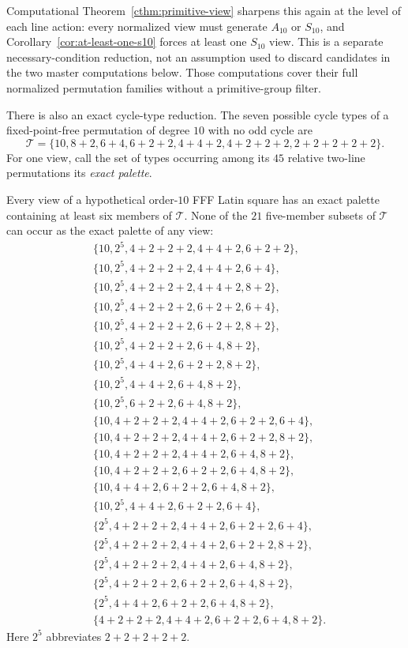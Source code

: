 Computational Theorem~\ref{cthm:primitive-view} sharpens this again at the
level of each line action: every normalized view must generate $A_{10}$ or
$S_{10}$, and Corollary~\ref{cor:at-least-one-s10} forces at least one
$S_{10}$ view.  This is a separate necessary-condition reduction, not an
assumption used to discard candidates in the two master computations below.
Those computations cover their full normalized permutation families without
a primitive-group filter.

There is also an exact cycle-type reduction.  The seven possible cycle types
of a fixed-point-free permutation of degree $10$ with no odd cycle are
\[
 \mathcal T=\{10,8+2,6+4,6+2+2,4+4+2,
                 4+2+2+2,2+2+2+2+2\}.
\]
For one view, call the set of types occurring among its $45$ relative
two-line permutations its \emph{exact palette}.

\begin{computationaltheorem}
\label{cthm:order10-palettes}
Every view of a hypothetical order-$10$ FFF Latin square has an exact palette
containing at least six members of $\mathcal T$.  None of the $21$ five-member
subsets of $\mathcal T$ can occur as the exact palette of any view:
\begingroup
\small
\setlength{\jot}{1pt}
\begin{align*}
 &\{10,2^5,4+2+2+2,4+4+2,6+2+2\},\\
 &\{10,2^5,4+2+2+2,4+4+2,6+4\},\\
 &\{10,2^5,4+2+2+2,4+4+2,8+2\},\\
 &\{10,2^5,4+2+2+2,6+2+2,6+4\},\\
 &\{10,2^5,4+2+2+2,6+2+2,8+2\},\\
 &\{10,2^5,4+2+2+2,6+4,8+2\},\\
 &\{10,2^5,4+4+2,6+2+2,8+2\},\\
 &\{10,2^5,4+4+2,6+4,8+2\},\\
 &\{10,2^5,6+2+2,6+4,8+2\},\\
 &\{10,4+2+2+2,4+4+2,6+2+2,6+4\},\\
 &\{10,4+2+2+2,4+4+2,6+2+2,8+2\},\\
 &\{10,4+2+2+2,4+4+2,6+4,8+2\},\\
 &\{10,4+2+2+2,6+2+2,6+4,8+2\},\\
 &\{10,4+4+2,6+2+2,6+4,8+2\},\\
 &\{10,2^5,4+4+2,6+2+2,6+4\},\\
 &\{2^5,4+2+2+2,4+4+2,6+2+2,6+4\},\\
 &\{2^5,4+2+2+2,4+4+2,6+2+2,8+2\},\\
 &\{2^5,4+2+2+2,4+4+2,6+4,8+2\},\\
 &\{2^5,4+2+2+2,6+2+2,6+4,8+2\},\\
 &\{2^5,4+4+2,6+2+2,6+4,8+2\},\\
 &\{4+2+2+2,4+4+2,6+2+2,6+4,8+2\}.
\end{align*}
\endgroup
Here $2^5$ abbreviates $2+2+2+2+2$.
\end{computationaltheorem}

